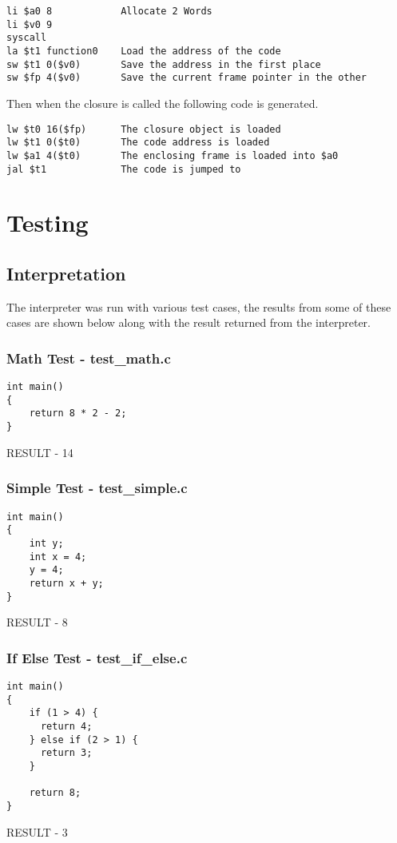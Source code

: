 \documentclass{article}
\begin{document}
\begin{lstlisting}
li $a0 8            Allocate 2 Words
li $v0 9
syscall
la $t1 function0    Load the address of the code
sw $t1 0($v0)       Save the address in the first place
sw $fp 4($v0)       Save the current frame pointer in the other
\end{lstlisting}

Then when the closure is called the following code is generated.

\begin{lstlisting}
lw $t0 16($fp)      The closure object is loaded
lw $t1 0($t0)       The code address is loaded
lw $a1 4($t0)       The enclosing frame is loaded into $a0
jal $t1             The code is jumped to
\end{lstlisting}

\section{Testing}

\subsection{Interpretation}
The interpreter was run with various test cases, the results from some of these
cases are shown below along with the result returned from the interpreter.

\subsubsection{Math Test - test\_math.c}
\begin{lstlisting}
int main()
{
    return 8 * 2 - 2;
}
\end{lstlisting}
RESULT - 14

\subsubsection{Simple Test - test\_simple.c}
\begin{lstlisting}
int main()
{
    int y;
    int x = 4;
    y = 4;
    return x + y;
}
\end{lstlisting}
RESULT - 8

\subsubsection{If Else Test - test\_if\_else.c}
\begin{lstlisting}
int main()
{
    if (1 > 4) {
      return 4;
    } else if (2 > 1) {
      return 3;
    }

    return 8;
}
\end{lstlisting}
RESULT - 3
\end{document}
